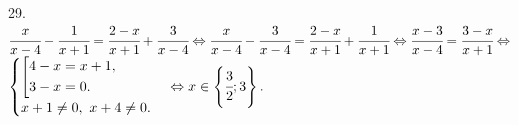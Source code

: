 29. $\cfrac{x}{x-4}-\cfrac{1}{x+1}=\cfrac{2-x}{x+1}+\cfrac{3}{x-4}\Leftrightarrow \cfrac{x}{x-4}-\cfrac{3}{x-4}=\cfrac{2-x}{x+1}+\cfrac{1}{x+1}
\Leftrightarrow \cfrac{x-3}{x-4}=\cfrac{3-x}{x+1}\Leftrightarrow$\\$ \begin{cases}
\left[
      \begin{gathered} 4-x=x+1,\hfill\\
      3-x=0.\hfill \end{gathered}\right.\\
x+1\neq0,\ x+4\neq0.\end{cases}\Leftrightarrow x\in\left\{\cfrac{3}{2};3\right\}.$\\
